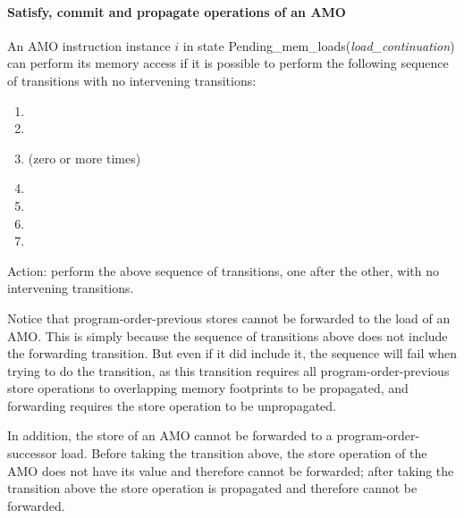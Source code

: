 \paragraph{Satisfy, commit and propagate operations of an AMO}\label{omm:do_amo}
An AMO instruction instance $i$ in state {\sc Pending\_mem\_loads}({\it load\_continuation}) can perform its memory access if it is possible to perform the following sequence of transitions with no intervening transitions:
\begin{enumerate}
\item {}
\item {}
\item {} (zero or more times)
\item {}
\item {}
\item {}
\item {}
\end{enumerate}
Action: perform the above sequence of transitions, one after the other, with no intervening transitions.

\begin{commentary}
Notice that program-order-previous stores cannot be forwarded to the load of an AMO.
This is simply because the sequence of transitions above does not include the forwarding transition.
But even if it did include it, the sequence will fail when trying to do the  transition, as this transition requires all program-order-previous store operations to overlapping memory footprints to be propagated, and forwarding requires the store operation to be unpropagated.

In addition, the store of an AMO cannot be forwarded to a program-order-successor load.
Before taking the transition above, the store operation of the AMO does not have its value and therefore cannot be forwarded; after taking the transition above the store operation is propagated and therefore cannot be forwarded.
\end{commentary}



